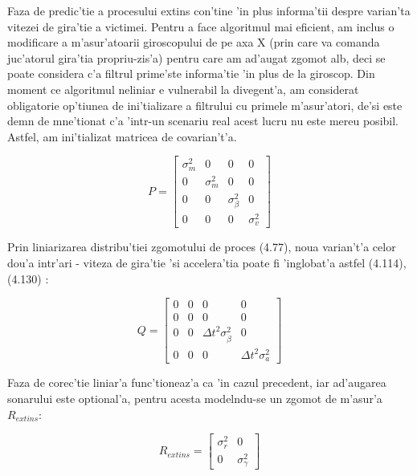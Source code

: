 \documentclass[12pt,a4paper,twoside]{report}
\begin{document}
\vspace{5px}

Faza de predic'tie a procesului extins con'tine 'in plus informa'tii despre varian'ta vitezei de gira'tie a victimei. Pentru a face algoritmul mai eficient, am inclus o modificare a m'asur'atoarii giroscopului de pe axa X (prin care va comanda juc'atorul gira'tia propriu-zis'a) pentru care am ad'augat zgomot alb, deci se poate considera c'a filtrul prime'ste informa'tie 'in plus de la giroscop. Din moment ce algoritmul neliniar e vulnerabil la divegent'a, am considerat obligatorie op'tiunea de ini'tializare a filtrului cu primele m'asur'atori, de'si este demn de mne'tionat c'a 'intr-un scenariu real acest lucru nu este mereu posibil. Astfel, am ini'tializat matricea de covarian't'a. 

\begin{equation}
    P = \begin{bmatrix}
     \sigma^2_{m} & 0 & 0 & 0 \\ 0 & \sigma^2_{m} & 0 & 0 \\ 0 & 0 &  \sigma^2_{\beta} & 0 \\ 0 & 0 & 0 & \sigma^2_{v} 
    \end{bmatrix}
\end{equation}

Prin liniarizarea distribu'tiei zgomotului de proces (4.77), noua varian't'a celor dou'a intr'ari - viteza de gira'tie 'si accelera'tia poate fi 'inglobat'a astfel (4.114), (4.130) \cite{AKSF}: 

\begin{equation}
    Q = \begin{bmatrix}
     0& 0 & 0 & 0 \\ 0 & 0 & 0 & 0 \\ 0 & 0 & \Delta t^2  \sigma^2_{\dot \beta} & 0 \\ 0 & 0 & 0 & \Delta t^2 \sigma^2_{a} 
    \end{bmatrix}
\end{equation}

Faza de corec'tie liniar'a func'tioneaz'a ca 'in cazul precedent, iar ad'augarea sonarului este optional'a, pentru acesta model\ia ndu-se un zgomot de m'asur'a $R_{extins}$:

\begin{equation}
    R_{extins} = \begin{bmatrix}
     \sigma^2_{r} & 0 \\ 0 & \sigma^2_{\gamma}
    \end{bmatrix}
\end{equation}
\end{document}
